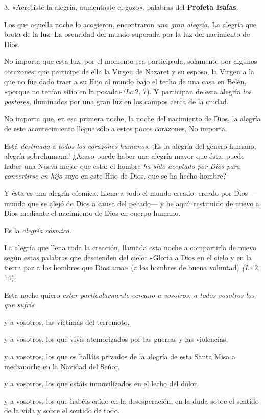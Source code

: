 \documentclass[]{article}
\begin{document}
3. «Acreciste la alegría, aumentaste el gozo», palabras del
\textbf{Profeta Isaías}.

Los que aquella noche lo acogieron, encontraron \emph{una gran alegría.}
La alegría que brota de la luz. La oscuridad del mundo superada por la
luz del nacimiento de Dios.

No importa que esta luz, por el momento sea participada, solamente por
algunos corazones: que participe de ella la Virgen de Nazaret y su
esposo, la Virgen a la que no fue dado traer a su Hijo al mundo bajo el
techo de una casa en Belén, «porque no tenían sitio en la
posada»\emph{(Lc} 2, 7). Y participan de esta alegría \emph{los
pastores,} iluminados por una gran luz en los campos cerca de la ciudad.

No importa que, en esa primera noche, la noche del nacimiento de Dios,
la alegría de este acontecimiento llegue sólo a estos pocos corazones.
No importa.

Está \emph{destinada} a \emph{todos los corazones humanos.} ¡Es la
alegría del género humano, alegría sobrehumana! ¿Acaso puede haber una
alegría mayor que ésta, puede haber una Nueva mejor que ésta: el hombre
\emph{ha sido aceptado por Dios para convertirse en hijo} suyo en este
Hijo de Dios, que se ha hecho hombre?

Y ésta es una alegría cósmica. Llena a todo el mundo creado: creado por
Dios ---mundo que se alejó de Dios a causa del pecado--- y he aquí:
restituido de nuevo a Dios mediante el nacimiento de Dios en cuerpo
humano.

Es la \emph{alegría cósmica. }

La alegría que llena toda la creación, llamada esta noche a compartirla
de nuevo según estas palabras que descienden del cielo: «Gloria a Dios
en el cielo y en la tierra paz a los hombres que Dios ama» (a los
hombres de buena voluntad) \emph{(Lc} 2, 14).

Esta noche quiero \emph{estar particularmente cercano a vosotros, a
todos vosotros los que sufrís }

y a vosotros, las víctimas del terremoto,

y a vosotros, los que vivís atemorizados por las guerras y las
violencias,

y a vosotros, los que os halláis privados de la alegría de esta Santa
Misa a medianoche en la Navidad del Señor,

y a vosotros, los que estáis inmovilizados en el lecho del dolor,

y a vosotros, los que habéis caído en la desesperación, en la duda sobre
el sentido de la vida y sobre el sentido de todo.
\end{document}
